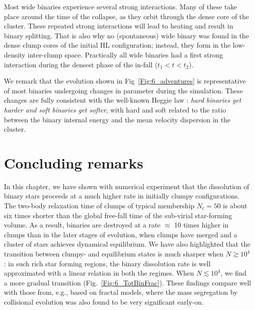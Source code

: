 Most wide binaries experience several strong interactions. Many of these take place around the time of the collapse, as they orbit  through the dense core of the cluster. These repeated strong interactions will lead to heating and result in binary splitting. That is also why no (spontaneous) wide binary was found in  the  dense  clump cores of the initial HL configuration; instead, they form in the low-density inter-clump space. Practically all wide binaries had a first strong interaction during the densest phase of the in-fall ($t_1 < t < t_2$). 

We remark that the evolution shown in Fig~\ref{Fig:6_adventures} is representative of most binaries undergoing changes in parameter during the simulation. These changes are fully consistent with the well-known Heggie law \citep{Heggie1975,Hills1975}: \textit{hard binaries get harder and soft binaries get softer}, with hard and soft related to the ratio between the binary internal energy and the mean velocity dispersion in the cluster.



\section{Concluding remarks}


In this chapter, we have shown with numerical experiment that the dissolution of binary stars proceeds at a much higher rate in initially clumpy configurations. The two-body relaxation time of clumps of typical membership $N_c = 50 $ is about six times shorter than the global free-fall time of the sub-virial star-forming volume. As a result, binaries are destroyed at a rate $\approx $ 10 times higher in clumps than in the later stages of evolution, when clumps have merged and a cluster of stars achieves dynamical equilibrium. We have also highlighted that the transition between clumpy- and equilibrium states is much sharper when $N \gtrsim 10^4$: in such rich star forming regions, the binary dissolution rate is well approximated with a linear relation in both the regimes. When $N \lesssim 10^4$, we find a more gradual transition (Fig.~\ref{Fig:6_TotBinFrac}). These findings  compare well with those from, e.g., \cite{Parker2011} based on fractal models, where the mass segregation by collisional evolution was also found to be very significant early-on. 

